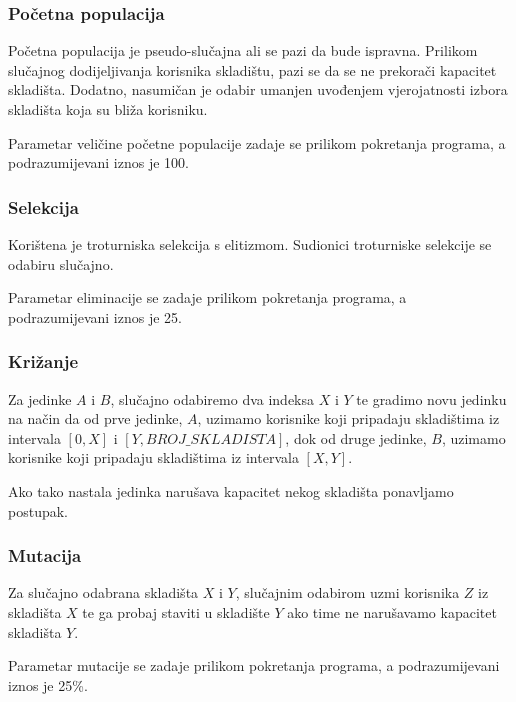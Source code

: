 \documentclass[utf8]{beamer}
\begin{document}
\begin{frame}
\frametitle{Početna populacija}

Početna populacija je pseudo-slučajna ali se pazi da bude ispravna. Prilikom slučajnog dodijeljivanja korisnika skladištu, pazi se da se ne prekorači kapacitet skladišta. Dodatno, nasumičan je odabir umanjen uvođenjem vjerojatnosti izbora skladišta koja su bliža korisniku.

\vspace{5mm}

Parametar veličine početne populacije zadaje se prilikom pokretanja programa, a podrazumijevani iznos je 100.

\end{frame}

\begin{frame}
\frametitle{Selekcija}

Korištena je troturniska selekcija s elitizmom. Sudionici troturniske selekcije se odabiru slučajno.

\vspace{5mm}

Parametar eliminacije se zadaje prilikom pokretanja programa, a podrazumijevani iznos je 25.

\end{frame}

\begin{frame}
\frametitle{Križanje}

Za jedinke $A$ i $B$, slučajno odabiremo dva indeksa $X$ i $Y$ te gradimo novu jedinku na način da od prve jedinke, $A$, uzimamo korisnike koji pripadaju skladištima iz intervala $[0, X]$ i $[Y, BROJ\_SKLADISTA]$, dok od druge jedinke, $B$, uzimamo korisnike koji pripadaju skladištima iz intervala $[X, Y]$. 

\vspace{5mm}

Ako tako nastala jedinka narušava kapacitet nekog skladišta ponavljamo postupak.

\end{frame}

\begin{frame}
\frametitle{Mutacija}

Za slučajno odabrana skladišta $X$ i $Y$, slučajnim odabirom uzmi korisnika $Z$ iz skladišta $X$ te ga probaj staviti u skladište $Y$ ako time ne narušavamo kapacitet skladišta $Y$.

\vspace{5mm}

Parametar mutacije se zadaje prilikom pokretanja programa, a podrazumijevani iznos je 25\%.

\end{frame}
\end{document}
